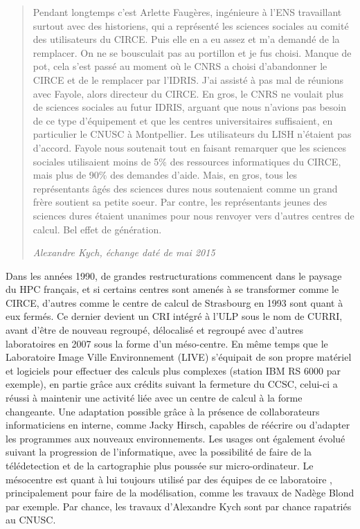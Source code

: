 \blockquote[\textit{Alexandre Kych, échange daté de mai 2015}]{Pendant longtemps c'est Arlette Faugères, ingénieure à l'ENS travaillant surtout avec des historiens, qui a représenté les sciences sociales au comité des utilisateurs du CIRCE. Puis elle en a eu assez et m'a demandé de la remplacer. On ne se bousculait pas au portillon et je fus choisi. Manque de pot, cela s'est passé au moment où le CNRS a choisi d'abandonner le CIRCE et de le remplacer par l'IDRIS. J'ai assisté à pas mal de réunions avec Fayole, alors directeur du CIRCE. En gros, le CNRS ne voulait plus de sciences sociales au futur IDRIS, arguant que nous n'avions pas besoin de ce type d'équipement et que les centres universitaires suffisaient, en particulier le CNUSC à Montpellier. Les utilisateurs du LISH n'étaient pas d'accord. Fayole nous soutenait tout en faisant remarquer que les sciences sociales utilisaient moins de 5\% des ressources informatiques du CIRCE, mais plus de 90\% des demandes d'aide. Mais, en gros, tous les représentants âgés des sciences dures nous soutenaient comme un grand frère soutient sa petite soeur. Par contre, les représentants jeunes des sciences dures étaient unanimes pour nous renvoyer vers d'autres centres de calcul. Bel effet de génération.}

Dans les années 1990, de grandes restructurations commencent dans le paysage du HPC français, et si certains centres sont amenés à se transformer comme le CIRCE, d'autres comme le centre de calcul de Strasbourg en 1993 sont quant à eux fermés. Ce dernier devient un CRI intégré à l'ULP sous le nom de CURRI, avant d'être de nouveau regroupé, délocalisé et regroupé avec d'autres laboratoires en 2007 sous la forme d'un méso-centre. En même temps que le Laboratoire Image Ville Environnement (LIVE) s'équipait de son propre matériel et logiciels pour effectuer des calculs plus complexes (station IBM RS 6000 par exemple), en partie grâce aux crédits suivant la fermeture du CCSC, celui-ci a réussi à maintenir une activité liée avec un centre de calcul à la forme changeante. Une adaptation possible grâce à la présence de collaborateurs informaticiens en interne, comme Jacky Hirsch, capables de réécrire ou d'adapter les programmes aux nouveaux environnements. Les usages ont également évolué suivant la progression de l'informatique, avec la possibilité de faire de la télédetection et de la cartographie plus poussée sur micro-ordinateur. Le mésocentre est quant à lui toujours utilisé par des équipes de ce laboratoire \autocite{Asch2012}, principalement pour faire de la modélisation, comme les travaux de Nadège Blond par exemple. Par chance, les travaux d'Alexandre Kych sont par chance rapatriés au CNUSC.

